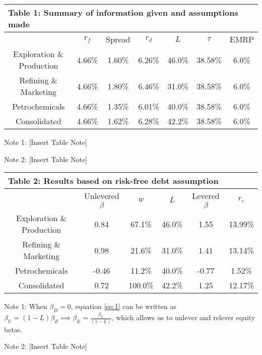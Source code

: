 \documentclass[AER]{AEA}
\begin{document}
\begin{spacing}{1.5}
\begin{table}[h!]
    \centering
    \begin{tabular}{|c|c|c|c|c|c|c|}
    \multicolumn{7}{l}{\textbf{Table 1: Summary of information given and assumptions made}}\\
    \hline
    & $r_f$ & Spread & $r_d$ & $L$ & $\tau$ & EMRP\\
     \hline
    Exploration \& Production & 4.66\% & 1.60\% & 6.26\% & 46.0\% & 38.58\% &  6.0\% \\
    \hline
    Refining \& Marketing & 4.66\% & 1.80\% & 6.46\% & 31.0\% & 38.58\% &  6.0\% \\
    \hline
    Petrochemicals & 4.66\% & 1.35\% & 6.01\% & 40.0\% & 38.58\% &  6.0\% \\
    \hline
    Consolidated & 4.66\% & 1.62\% & 6.28\% & 42.2\% & 38.58\% &  6.0\% \\
    \hline
    \end{tabular}
    \begin{tablenotes}
    \item Note 1: [Insert Table Note]
    \item Note 2: [Insert Table Note]
    \end{tablenotes}
\end{table}

\begin{table}[h!]
    \centering
    \begin{tabular}{|c|c|c|c|c|c|}
    \multicolumn{6}{l}{\textbf{Table 2: Results based on risk-free debt assumption}}\\
    \hline
     & Unlevered $\beta$ & $w$ & $L$ & Levered $\beta$ & $r_e$\\
     \hline
    Exploration \& Production & 0.84 & 67.1\% & 46.0\% & 1.55 & 13.99\% \\
    \hline
    Refining \& Marketing & 0.98 & 21.6\% & 31.0\% & 1.41 & 13.14\% \\
    \hline
    Petrochemicals & -0.46 & 11.2\% & 40.0\% & -0.77 & 1.52\% \\
    \hline
    Consolidated & 0.72 & 100.0\% & 42.2\% & 1.25 & 12.17\% \\
    \hline
    \end{tabular}
    \begin{tablenotes}
    \item Note 1: When $\beta_D=0$, equation \ref{eq:1} can be written as $\beta_U=(1-L)\beta_E\implies \beta_E=\frac{\beta_U}{(1-L)}$, which allows us to unlever and relever equity betas.
    \item Note 2: [Insert Table Note]
    \end{tablenotes}
\end{table}


\end{spacing}
\end{document}
